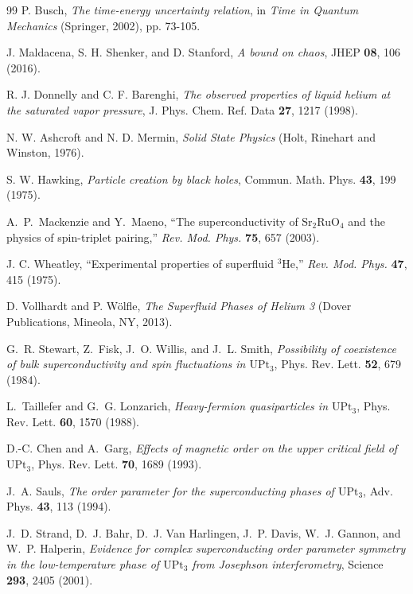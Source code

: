 \documentclass[11pt,a4paper]{article}
\begin{document}
\begin{thebibliography}{99}
P. Busch, \textit{The time-energy uncertainty relation}, in \textit{Time in Quantum Mechanics} (Springer, 2002), pp. 73-105.

J. Maldacena, S. H. Shenker, and D. Stanford, \textit{A bound on chaos}, JHEP \textbf{08}, 106 (2016).

R. J. Donnelly and C. F. Barenghi, \textit{The observed properties of liquid helium at the saturated vapor pressure}, J. Phys. Chem. Ref. Data \textbf{27}, 1217 (1998).

N. W. Ashcroft and N. D. Mermin, \textit{Solid State Physics} (Holt, Rinehart and Winston, 1976).

S. W. Hawking, \textit{Particle creation by black holes}, Commun. Math. Phys. \textbf{43}, 199 (1975).

  A.~P.~Mackenzie and Y.~Maeno,
  ``The superconductivity of Sr$_2$RuO$_4$ and the physics of spin-triplet pairing,''
  \textit{Rev. Mod. Phys.} \textbf{75}, 657 (2003).

J. C. Wheatley, 
``Experimental properties of superfluid $^3$He,''
\emph{Rev. Mod. Phys.} \textbf{47}, 415 (1975).

D. Vollhardt and P. Wölfle, \textit{The Superfluid Phases of Helium 3} (Dover Publications, Mineola, NY, 2013).

G.~R. Stewart, Z.~Fisk, J.~O. Willis, and J.~L. Smith,
\textit{Possibility of coexistence of bulk superconductivity and spin fluctuations in $\text{UPt}_3$},
Phys. Rev. Lett. \textbf{52}, 679 (1984).

L.~Taillefer and G.~G. Lonzarich,
\textit{Heavy-fermion quasiparticles in $\text{UPt}_3$},
Phys. Rev. Lett. \textbf{60}, 1570 (1988).

D.-C. Chen and A.~Garg,
\textit{Effects of magnetic order on the upper critical field of $\text{UPt}_3$},
Phys. Rev. Lett. \textbf{70}, 1689 (1993).

J.~A. Sauls,
\textit{The order parameter for the superconducting phases of $\text{UPt}_3$},
Adv. Phys. \textbf{43}, 113 (1994).

J.~D. Strand, D.~J. Bahr, D.~J. Van Harlingen, J.~P. Davis, W.~J. Gannon, and W.~P. Halperin,
\textit{Evidence for complex superconducting order parameter symmetry in the low-temperature phase of $\text{UPt}_3$ from Josephson interferometry},
Science \textbf{293}, 2405 (2001).


\end{thebibliography}
\end{document}
